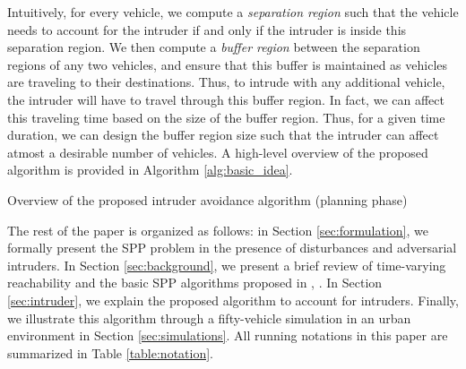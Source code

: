 Intuitively, for every vehicle, we compute a \textit{separation region} such that the vehicle needs to account for the intruder if and only if the intruder is inside this separation region. We then compute a \textit{buffer region} between the separation regions of any two vehicles, and ensure that this buffer is maintained as vehicles are traveling to their destinations. Thus, to intrude with any additional vehicle, the intruder will have to travel through this buffer region. In fact, we can affect this traveling time based on the size of the buffer region. Thus, for a given time duration, we can design the buffer region size such that the intruder can affect atmost a desirable number of vehicles. A high-level overview of the proposed algorithm is provided in Algorithm \ref{alg:basic_idea}.    
%
\begin{algorithm}[tb]
	\DontPrintSemicolon
	\caption{Overview of the proposed intruder avoidance algorithm (planning phase)}
	\label{alg:basic_idea}
\end{algorithm}
%

The rest of the paper is organized as follows: in Section \ref{sec:formulation}, we formally present the SPP problem in the presence of disturbances and adversarial intruders. In Section \ref{sec:background}, we present a brief review of time-varying reachability and the basic SPP algorithms proposed in \cite{Chen15c}, \cite{Bansal2017}. In Section \ref{sec:intruder}, we explain the proposed algorithm to account for intruders. Finally, we illustrate this algorithm through a fifty-vehicle simulation in an urban environment in Section \ref{sec:simulations}. All running notations in this paper are summarized in Table \ref{table:notation}.